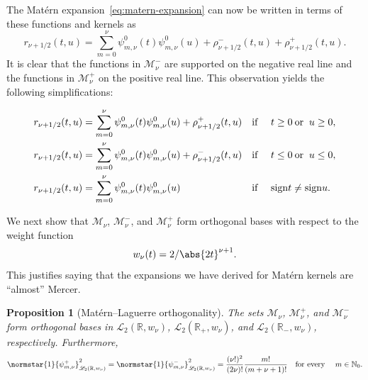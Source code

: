 \documentclass{article}
\newtheorem{proposition}{Proposition}
{\theorembodyfont{\rmfamily}\newtheorem{remark}{Remark}}
\newcommand{\N}{\mathbb{N}}
\begin{document}
The Mat{\'e}rn expansion~\eqref{eq:matern-expansion} can now be written in
terms of these functions and kernels as
\[ r_{\nu + 1 / 2} (t, u) = \sum_{m = 0}^{\nu} \psi_{m, \nu}^0 (t) \psi_{m,
   \nu}^0 (u) + \rho_{\nu + 1 / 2}^- (t, u) + \rho_{\nu + 1 / 2}^+ (t, u) . \]
It is clear that the functions in $\mathscr{M}_{\nu}^-$ are supported on the
negative real line and the functions in $\mathscr{M}_{\nu}^+$ on the positive
real line. This observation yields the following simplifications:

\begin{align}
  r_{\nu + 1 / 2} (t, u) & = \sum_{m = 0}^{\nu} \psi_{m, \nu}^0 (t) \psi_{m,
  \nu}^0 (u) + \rho_{\nu + 1 / 2}^+ (t, u) &  & \text{if } \quad t \geq 0
  \hspace{0.22em} \text{or } \hspace{0.22em} u \geq 0, 
  \label{eq:matern-simplification-positive}\\
  r_{\nu + 1 / 2} (t, u) & = \sum_{m = 0}^{\nu} \psi_{m, \nu}^0 (t) \psi_{m,
  \nu}^0 (u) + \rho_{\nu + 1 / 2}^- (t, u) &  & \text{if } \quad t \leq 0
  \hspace{0.22em} \text{or } \hspace{0.22em} u \leq 0, \\
  r_{\nu + 1 / 2} (t, u) & = \sum_{m = 0}^{\nu} \psi_{m, \nu}^0 (t) \psi_{m,
  \nu}^0 (u) &  & \text{if } \quad \mathrm{sign} t \neq \mathrm{sign} u. 
  \label{eq:matern-simplification-sign}
\end{align}

We next show that $\mathscr{M}_{\nu}$, $\mathscr{M}_{\nu}^-$, and
$\mathscr{M}_{\nu}^+$ form orthogonal bases with respect to the weight
function
\[ w_{\nu} (t) = 2 / \abs{2 t}^{\nu + 1} . \]
This justifies saying that the expansions we have derived for Mat{\'e}rn
kernels are ``almost'' Mercer.

\begin{proposition}
  [Mat{\'e}rn--Laguerre orthogonality]\label{prop:matern_laguerre_L2}The sets
  $\mathscr{M}_{\nu}$, $\mathscr{M}_{\nu}^+$, and $\mathscr{M}_{\nu}^-$ form
  orthogonal bases in $\mathscr{L}_2 (\mathbb{R}, w_{\nu})$, $\mathscr{L}_2
  (\mathbb{R}_+, w_{\nu})$, and $\mathscr{L}_2 (\mathbb{R}_-, w_{\nu})$,
  respectively. Furthermore,
  \[ \normstar{1}{\psi^+_{m, \nu}}_{\mathscr{L}_2 (\mathbb{R}, w_{\nu})}^2 =
     \normstar{1}{\psi^-_{m, \nu}}_{\mathscr{L}_2 (\mathbb{R}, w_{\nu})}^2 =
     \frac{(\nu !)^2}{(2 \nu) !}  \frac{m!}{(m + \nu + 1) !}  \quad \text{for
     every } \quad m \in \N_0 . \]
\end{proposition}
\end{document}
